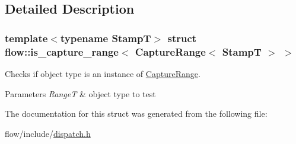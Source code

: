\subsection{Detailed Description}
\subsubsection*{template$<$typename StampT$>$\newline
struct flow\+::is\+\_\+capture\+\_\+range$<$ Capture\+Range$<$ Stamp\+T $>$ $>$}

Checks if object type is an instance of \hyperlink{structflow_1_1_capture_range}{Capture\+Range}. 


\begin{DoxyParams}{Parameters}
{\em RangeT} & object type to test \\
\hline
\end{DoxyParams}


The documentation for this struct was generated from the following file\+:\begin{DoxyCompactItemize}
\item 
flow/include/\hyperlink{dispatch_8h}{dispatch.\+h}\end{DoxyCompactItemize}

